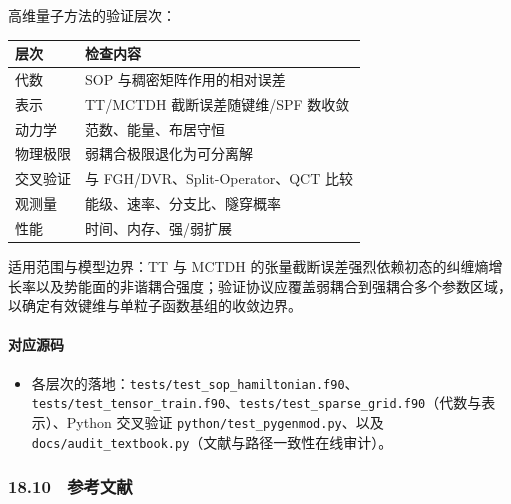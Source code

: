 \documentclass[
]{ctexbook}
\providecommand{\tightlist}{%
  \setlength{\itemsep}{0pt}\setlength{\parskip}{0pt}}
\begin{document}
高维量子方法的验证层次：

\begin{longtable}[]{@{}ll@{}}
\toprule
层次 & 检查内容\tabularnewline
\midrule
\endhead
代数 & SOP 与稠密矩阵作用的相对误差\tabularnewline
表示 & TT/MCTDH 截断误差随键维/SPF 数收敛\tabularnewline
动力学 & 范数、能量、布居守恒\tabularnewline
物理极限 & 弱耦合极限退化为可分离解\tabularnewline
交叉验证 & 与 FGH/DVR、Split-Operator、QCT 比较\tabularnewline
观测量 & 能级、速率、分支比、隧穿概率\tabularnewline
性能 & 时间、内存、强/弱扩展\tabularnewline
\bottomrule
\end{longtable}

适用范围与模型边界：TT 与 MCTDH
的张量截断误差强烈依赖初态的纠缠熵增长率以及势能面的非谐耦合强度；验证协议应覆盖弱耦合到强耦合多个参数区域，以确定有效键维与单粒子函数基组的收敛边界。

\hypertarget{ux5bf9ux5e94ux6e90ux7801-87}{%
\paragraph{对应源码}\label{ux5bf9ux5e94ux6e90ux7801-87}}

\begin{itemize}
\tightlist
\item
  各层次的落地：\texttt{tests/test\_sop\_hamiltonian.f90}、\texttt{tests/test\_tensor\_train.f90}、\texttt{tests/test\_sparse\_grid.f90}（代数与表示）、Python
  交叉验证 \texttt{python/test\_pygenmod.py}、以及
  \texttt{docs/audit\_textbook.py}（文献与路径一致性在线审计）。
\end{itemize}

\hypertarget{ux53c2ux8003ux6587ux732e-8}{%
\subsubsection{18.10　参考文献}\label{ux53c2ux8003ux6587ux732e-8}}
\end{document}
